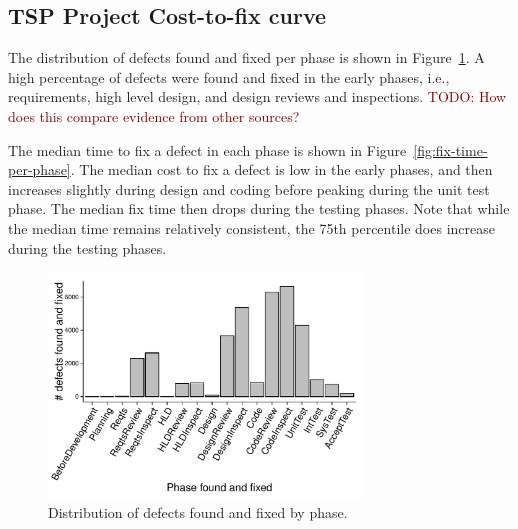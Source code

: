 \documentclass{sig-alternate}
\newcommand{\todo}[1]{\textcolor{Maroon}{TODO: #1}}
\newcommand{\fig}[1]{Figure~\ref{fig:#1}}
\begin{document}
\subsection{TSP Project Cost-to-fix curve}

The distribution of defects found and fixed per phase is shown in Figure~\ref{fig:fix-phase-dist}. A high percentage of defects were found and fixed in the early phases, i.e., requirements, high level design, and design reviews and inspections. \todo{How does this compare evidence from other sources?}

The median time to fix a defect in each phase is shown in \fig{fix-time-per-phase}. The median cost to fix a defect is low in the early phases, and then increases slightly during design and coding before peaking during the unit test phase. The median fix time then drops during the testing phases. Note that while the median time remains relatively consistent, the 75th percentile does increase during the testing phases.

\begin{figure}[!ht]
\begin{center}
\includegraphics[width=3.3in]{fix-phase-dist.pdf}
\end{center}
\caption{Distribution of defects found and fixed by phase.}
\label{fig:fix-phase-dist}
\end{figure}
\end{document}
